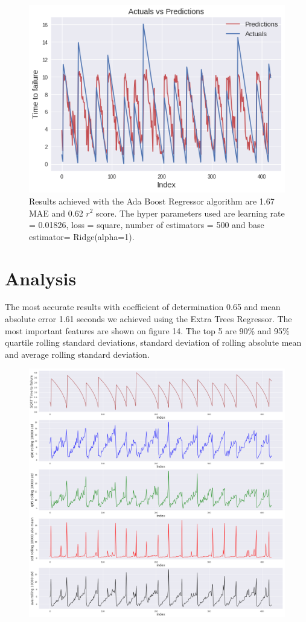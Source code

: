 \documentclass[]{llncs} %
\begin{document}
\begin{figure}[H]
	\centering
	\includegraphics[width=.9\linewidth]{results2}
	\caption{Results achieved with the Ada Boost Regressor algorithm are 1.67 MAE and 0.62 $r^2$ score. The hyper parameters used are learning rate = 0.01826, loss = square, number of estimators = 500 and base estimator= Ridge(alpha=1).}
	\label{fig:results2}
\end{figure}
\clearpage
\newpage
\section{Analysis}
The most accurate results with coefficient of determination 0.65 and mean absolute error 1.61 seconds we achieved using the Extra Trees Regressor. The most important features are shown on figure 14. The top 5 are 90\% and 95\% quartile rolling standard deviations, standard deviation of rolling absolute mean and average rolling standard deviation.
\begin{figure}[H]
	\centering
	\includegraphics[width=1\linewidth]{analysis}
	\caption{}
	\label{fig:analysis}
\end{figure}
\end{document}
